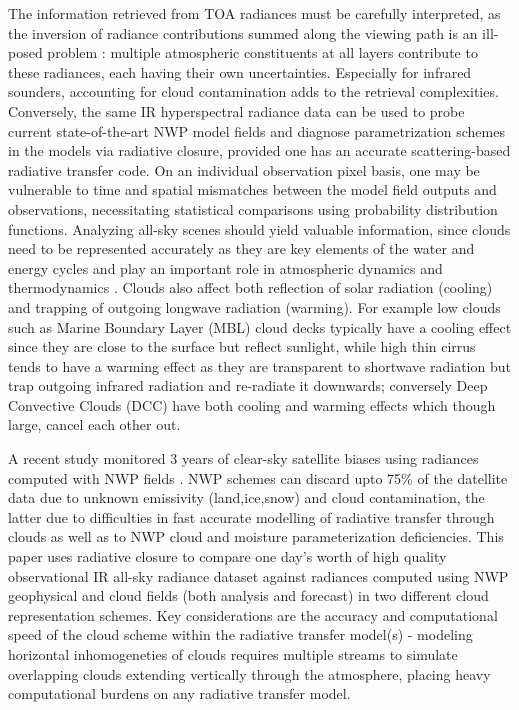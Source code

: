 \documentclass[agupp]{aguplus}              %
\begin{document}
\begin{article}
The information retrieved from TOA radiances must be carefully
interpreted, as the inversion of radiance contributions summed along
the viewing path is an ill-posed problem : multiple atmospheric
constituents at all layers contribute to these radiances, each having
their own uncertainties. Especially for infrared sounders, accounting
for cloud contamination adds to the retrieval complexities.
Conversely, the same IR hyperspectral radiance data can be used to
probe current state-of-the-art NWP model fields and diagnose
parametrization schemes in the models \citep{she:13} via radiative
closure, provided one has an accurate scattering-based radiative
transfer code. On an individual observation pixel basis, one may be
vulnerable to time and spatial mismatches between the model field
outputs and observations, necessitating statistical comparisons using
probability distribution functions.  Analyzing all-sky scenes should
yield valuable information, since clouds need to be represented
accurately as they are key elements of the water and energy cycles and
play an important role in atmospheric dynamics and thermodynamics
\citep{kok:11}. Clouds also affect both reflection of solar radiation
(cooling) and trapping of outgoing longwave radiation (warming).  For
example low clouds such as Marine Boundary Layer (MBL) cloud decks
typically have a cooling effect since they are close to the surface
but reflect sunlight, while high thin cirrus tends to have a warming
effect as they are transparent to shortwave radiation but trap
outgoing infrared radiation and re-radiate it downwards; conversely
Deep Convective Clouds (DCC) have both cooling and warming effects
which though large, cancel each other out.

A recent study monitored 3 years of clear-sky satellite biases using
radiances computed with NWP fields \citep{sau:13}. NWP schemes can
discard upto 75\% of the datellite data \cite{bau:10} due to unknown
emissivity (land,ice,snow) and cloud contamination, the latter due to
difficulties in fast accurate modelling of radiative transfer through
clouds as well as to NWP cloud and moisture parameterization
deficiencies. This paper uses radiative closure to compare one day's
worth of high quality observational IR all-sky radiance dataset
against radiances computed using NWP geophysical and cloud fields
(both analysis and forecast) in two different cloud representation
schemes. Key considerations are the accuracy and computational speed
of the cloud scheme within the radiative transfer model(s) - modeling
horizontal inhomogeneties of clouds requires multiple streams to
simulate overlapping clouds extending vertically through the
atmosphere, placing heavy computational burdens on any
radiative transfer model.


\end{article}
\end{document}
